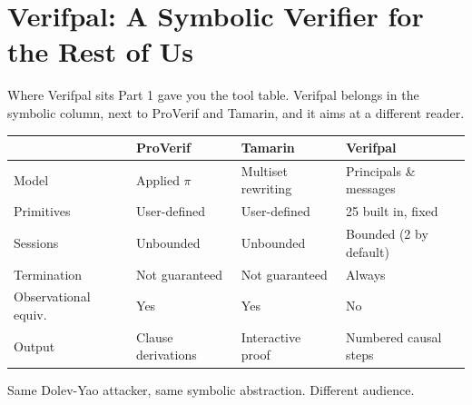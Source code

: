 \ifdefined\PRESENTATION\else\PassOptionsToClass{handout}{beamer}\fi\documentclass[aspectratio=169, lualatex]{beamer}
\begin{document}
\section{Verifpal: A Symbolic Verifier for the Rest of Us}

\begin{frame}{Where Verifpal sits}
	Part 1 gave you the tool table. Verifpal belongs in the symbolic column, next to ProVerif and Tamarin, and it aims at a different reader.
	\vspace{0.5em}
	\begin{center}
		\small
		\begin{tabular}{|l|l|l|l|}
			\hline
			                     & \textbf{ProVerif}  & \textbf{Tamarin}   & \textbf{Verifpal}      \\
			\hline
			Model                & Applied $\pi$      & Multiset rewriting & Principals \& messages \\
			\hline
			Primitives           & User-defined       & User-defined       & 25 built in, fixed     \\
			\hline
			Sessions             & Unbounded          & Unbounded          & Bounded (2 by default) \\
			\hline
			Termination          & Not guaranteed     & Not guaranteed     & Always                 \\
			\hline
			Observational equiv.\ & Yes               & Yes                & No                     \\
			\hline
			Output               & Clause derivations & Interactive proof  & Numbered causal steps  \\
			\hline
		\end{tabular}
	\end{center}
	\vspace{0.5em}
	\begin{center}
		Same Dolev-Yao attacker, same symbolic abstraction. Different audience.
	\end{center}
\end{frame}
\end{document}
